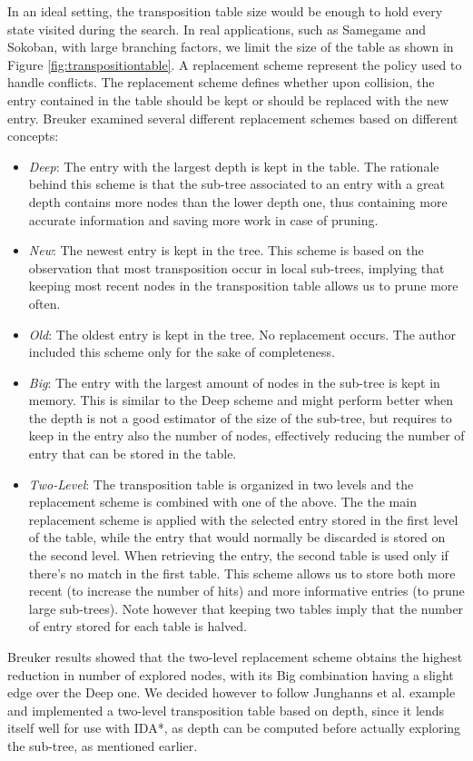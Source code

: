 \medskip\noindent
In an ideal setting, the transposition table size would be enough to hold every state visited during the search. In real applications, such as Samegame and Sokoban, with large branching factors, we limit the size of the table as shown in Figure \ref{fig:transpositiontable}. A replacement scheme represent the policy used to handle conflicts. The replacement scheme defines whether upon collision, the entry contained in the table should be kept or should be replaced with the new entry. Breuker \cite{transpositiontables} examined several different replacement schemes based on different concepts:
\begin{itemize}
    \item \textit{Deep}: The entry with the largest depth is kept in the table. The rationale behind this scheme is that the sub-tree associated to an entry with a great depth contains more nodes than the lower depth one, thus containing more accurate information and saving more work in case of pruning.
    \item \textit{New}: The newest entry is kept in the tree. This scheme is based on the observation that most transposition occur in local sub-trees, implying that keeping most recent nodes in the transposition table allows us to prune more often.
    \item \textit{Old}: The oldest entry is kept in the tree. No replacement occurs. The author included this scheme only for the sake of completeness.
    \item \textit{Big}: The entry with the largest amount of nodes in the sub-tree is kept in memory. This is similar to the Deep scheme and might perform better when the depth is not a good estimator of the size of the sub-tree, but requires to keep in the entry also the number of nodes, effectively reducing the number of entry that can be stored in the table.
    \item \textit{Two-Level}: The transposition table is organized in two levels and the replacement scheme is combined with one of the above. The the main replacement scheme is applied with the selected entry stored in the first level of the table, while the entry that would normally be discarded is stored on the second level. When retrieving the entry, the second table is used only if there's no match in the first table. This scheme allows us to store both more recent (to increase the number of hits) and more informative entries (to prune large sub-trees). Note however that keeping two tables imply that the number of entry stored for each table is halved.
\end{itemize}
Breuker \cite{transpositiontables} results showed that the two-level replacement scheme obtains the highest reduction in number of explored nodes, with its Big combination having a slight edge over the Deep one. We decided however to follow Junghanns et al. \cite{Junghanns99pushingthe} example and implemented a two-level transposition table based on depth, since it lends itself well for use with IDA*, as depth can be computed before actually exploring the sub-tree, as mentioned earlier.

